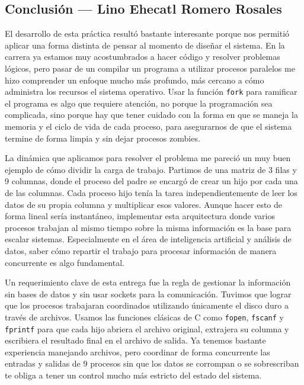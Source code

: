 \clearpage
\subsection{Conclusión — Lino Ehecatl Romero Rosales}
\label{sec:prac02:concl:lino}

El desarrollo de esta práctica resultó bastante interesante porque nos permitió aplicar una forma distinta de pensar al momento de diseñar el sistema. En la carrera ya estamos muy acostumbrados a hacer código y resolver problemas lógicos, pero pasar de un compilar un programa a utilizar procesos paralelos me hizo comprender un enfoque mucho más profundo, más cercano a cómo administra los recursos el sistema operativo. Usar la función \texttt{fork} para ramificar el programa es algo que requiere atención, no porque la programación sea complicada, sino porque hay que tener cuidado con la forma en que se maneja la memoria y el ciclo de vida de cada proceso, para asegurarnos de que el sistema termine de forma limpia y sin dejar procesos zombies.

La dinámica que aplicamos para resolver el problema me pareció un muy buen ejemplo de cómo dividir la carga de trabajo. Partimos de una matriz de 3 filas y 9 columnas, donde el proceso del padre se encargó de crear un hijo por cada una de las columnas. Cada proceso hijo tenía la tarea independientemente de leer los datos de su propia columna y multiplicar esos valores. Aunque hacer esto de forma lineal sería instantáneo, implementar esta arquitectura donde varios procesos trabajan al mismo tiempo sobre la misma información es la base para escalar sistemas. Especialmente en el área de inteligencia artificial y análisis de datos, saber cómo repartir el trabajo para procesar información de manera concurrente es algo fundamental.

Un requerimiento clave de esta entrega fue la regla de gestionar la información sin bases de datos y sin usar sockets para la comunicación. Tuvimos que lograr que los procesos trabajaran coordinados utilizando únicamente el disco duro a través de archivos. Usamos las funciones clásicas de C como \texttt{fopen}, \texttt{fscanf} y \texttt{fprintf} para que cada hijo abriera el archivo original, extrajera su columna y escribiera el resultado final en el archivo de salida. Ya tenemos bastante experiencia manejando archivos, pero coordinar de forma concurrente las entradas y salidas de 9 procesos sin que los datos se corrompan o se sobrescriban te obliga a tener un control mucho más estricto del estado del sistema.

